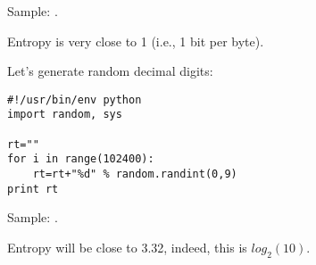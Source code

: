Sample: .

Entropy is very close to 1 (i.e., 1 bit per byte).

Let's generate random decimal digits:

\begin{lstlisting}[style=custompy]
#!/usr/bin/env python
import random, sys

rt=""
for i in range(102400):
    rt=rt+"%d" % random.randint(0,9)
print rt
\end{lstlisting}

Sample: .

Entropy will be close to 3.32, indeed, this is $log_2(10)$.

